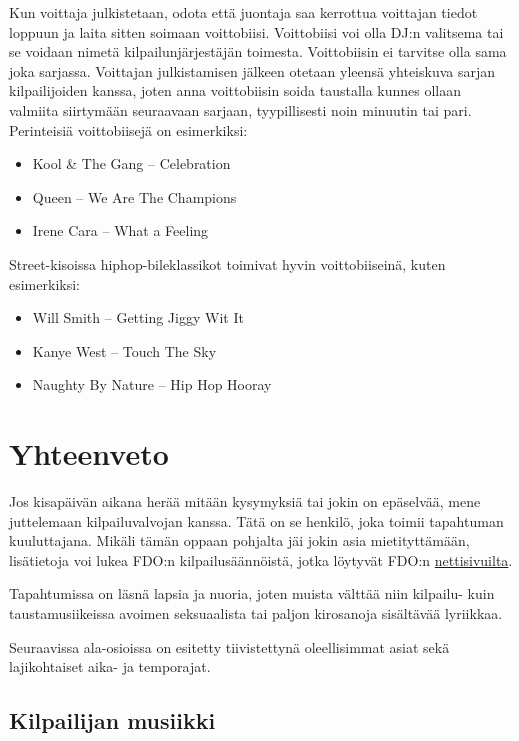 \documentclass[12pt, a4paper, oneside]{article}
\begin{document}
Kun voittaja julkistetaan, odota että juontaja saa kerrottua voittajan tiedot loppuun ja laita sitten soimaan voittobiisi. Voittobiisi voi olla DJ:n valitsema tai se voidaan nimetä kilpailunjärjestäjän toimesta. Voittobiisin ei tarvitse olla sama joka sarjassa. Voittajan julkistamisen jälkeen otetaan yleensä yhteiskuva sarjan kilpailijoiden kanssa, joten anna voittobiisin soida taustalla kunnes ollaan valmiita siirtymään seuraavaan sarjaan, tyypillisesti noin minuutin tai pari. Perinteisiä voittobiisejä on esimerkiksi:
\begin{itemize}[nosep]
    \item Kool \& The Gang -- Celebration
    \item Queen -- We Are The Champions
    \item Irene Cara -- What a Feeling
\end{itemize}

Street-kisoissa hiphop-bileklassikot toimivat hyvin voittobiiseinä, kuten esimerkiksi:
\begin{itemize}[nosep]
    \item Will Smith -- Getting Jiggy Wit It
    \item Kanye West -- Touch The Sky
    \item Naughty By Nature -- Hip Hop Hooray
\end{itemize}

\section{Yhteenveto} \label{yhteenveto}

Jos kisapäivän aikana herää mitään kysymyksiä tai jokin on epäselvää, mene juttelemaan kilpailuvalvojan kanssa. Tätä on se henkilö, joka toimii tapahtuman kuuluttajana. Mikäli tämän oppaan pohjalta jäi jokin asia mietityttämään, lisätietoja voi lukea FDO:n kilpailusäännöistä, jotka löytyvät FDO:n \href{https://fdo.fi/kilpailut/}{nettisivuilta}.

Tapahtumissa on läsnä lapsia ja nuoria, joten muista välttää niin kilpailu- kuin taustamusiikeissa avoimen seksuaalista tai paljon kirosanoja sisältävää lyriikkaa.

Seuraavissa ala-osioissa on esitetty tiivistettynä oleellisimmat asiat sekä lajikohtaiset aika- ja temporajat.

\subsection{Kilpailijan musiikki}
\end{document}
